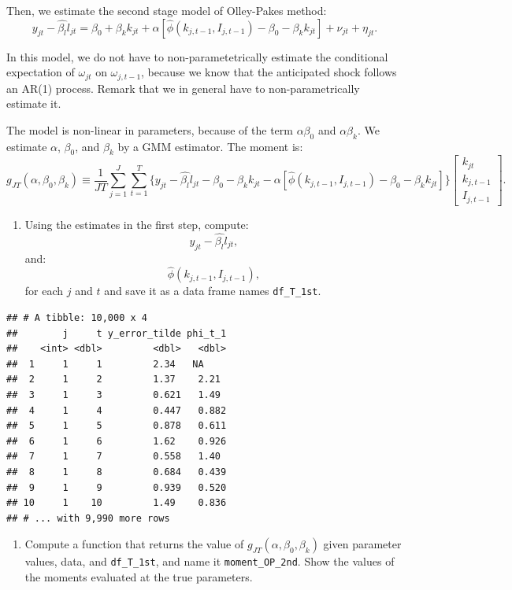 \documentclass[]{book}
\providecommand{\tightlist}{%
  \setlength{\itemsep}{0pt}\setlength{\parskip}{0pt}}
\begin{document}
Then, we estimate the second stage model of Olley-Pakes method: \[
y_{jt} - \hat{\beta_l} l_{jt} = \beta_0 + \beta_k k_{jt} + \alpha[\hat{\phi}(k_{j, t - 1}, I_{j, t - 1}) - \beta_0 - \beta_k k_{jt}] + \nu_{jt} + \eta_{jt}.
\]

In this model, we do not have to non-parametetrically estimate the
conditional expectation of \(\omega_{jt}\) on \(\omega_{j, t - 1}\),
because we know that the anticipated shock follows an AR(1) process.
Remark that we in general have to non-parametrically estimate it.

The model is non-linear in parameters, because of the term
\(\alpha \beta_0\) and \(\alpha \beta_k\). We estimate \(\alpha\),
\(\beta_0\), and \(\beta_k\) by a GMM estimator. The moment is: \[
g_{JT}(\alpha, \beta_0, \beta_k) \equiv \frac{1}{JT}\sum_{j = 1}^J \sum_{t = 1}^T \{y_{jt} - \hat{\beta_l} l_{jt} - \beta_0 - \beta_k k_{jt} - \alpha[\hat{\phi}(k_{j, t - 1}, I_{j, t - 1}) - \beta_0 - \beta_k k_{jt}]\} 
\begin{bmatrix}
k_{jt} \\
k_{j, t - 1} \\
I_{j, t - 1}
\end{bmatrix}.
\]

\begin{enumerate}
\def\labelenumi{\arabic{enumi}.}
\setcounter{enumi}{4}
\tightlist
\item
  Using the estimates in the first step, compute: \[
  y_{jt} - \hat{\beta_l} l_{jt},
  \] and: \[
  \hat{\phi}(k_{j, t - 1}, I_{j, t - 1}),
  \] for each \(j\) and \(t\) and save it as a data frame names
  \texttt{df\_T\_1st}.
\end{enumerate}

\begin{verbatim}
## # A tibble: 10,000 x 4
##        j     t y_error_tilde phi_t_1
##    <int> <dbl>         <dbl>   <dbl>
##  1     1     1         2.34   NA    
##  2     1     2         1.37    2.21 
##  3     1     3         0.621   1.49 
##  4     1     4         0.447   0.882
##  5     1     5         0.878   0.611
##  6     1     6         1.62    0.926
##  7     1     7         0.558   1.40 
##  8     1     8         0.684   0.439
##  9     1     9         0.939   0.520
## 10     1    10         1.49    0.836
## # ... with 9,990 more rows
\end{verbatim}

\begin{enumerate}
\def\labelenumi{\arabic{enumi}.}
\setcounter{enumi}{5}
\tightlist
\item
  Compute a function that returns the value of
  \(g_{JT}(\alpha, \beta_0, \beta_k)\) given parameter values, data, and
  \texttt{df\_T\_1st}, and name it \texttt{moment\_OP\_2nd}. Show the
  values of the moments evaluated at the true parameters.
\end{enumerate}
\end{document}
